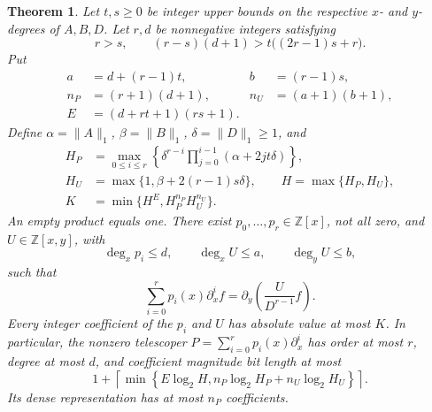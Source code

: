 \documentclass[11pt,a4paper]{article}
\newtheorem{theorem}{Theorem}[section]
\theoremstyle{remark}\newtheorem{remark}[theorem]{Remark}
\begin{document}
\begin{theorem}\label{he:main}
Let $t,s\ge0$ be integer upper bounds on the respective $x$- and
$y$-degrees of $A,B,D$. Let $r,d$ be nonnegative integers satisfying
\begin{equation}\label{he:admissible}
 r>s,\qquad
 (r-s)(d+1)>t\bigl((2r-1)s+r\bigr).
\end{equation}
Put
\begin{align*}
 a&=d+(r-1)t,& b&=(r-1)s,\\
 n_P&=(r+1)(d+1),&n_U&=(a+1)(b+1),\\
 E&=(d+rt+1)(rs+1).
\end{align*}
Define $\alpha=\|A\|_1$, $\beta=\|B\|_1$, $\delta=\|D\|_1\ge1$, and
\begin{align}
 H_P&=\max_{0\le i\le r}
  \left\{\delta^{r-i}\prod_{j=0}^{i-1}(\alpha+2jt\delta)\right\},
       \label{he:hp}\\
 H_U&=\max\{1,\beta+2(r-1)s\delta\},\qquad
 H=\max\{H_P,H_U\},\label{he:hu}\\
 K&=\min\{H^E,H_P^{n_P}H_U^{n_U}\}.\label{he:K}
\end{align}
An empty product equals one. There exist $p_0,\ldots,p_r\in\mathbb Z[x]$,
not all zero, and $U\in\mathbb Z[x,y]$, with
\[
 \deg_xp_i\le d,\qquad \deg_xU\le a,\qquad \deg_yU\le b,
\]
such that
\begin{equation}\label{he:identity}
 \sum_{i=0}^r p_i(x)\partial_x^i f
   =\partial_y\left(\frac{U}{D^{r-1}}f\right).
\end{equation}
Every integer coefficient of the $p_i$ and $U$ has absolute value at most
$K$. In particular, the nonzero telescoper
$P=\sum_{i=0}^rp_i(x)\partial_x^i$ has order at most $r$, degree at most
$d$, and coefficient magnitude bit length at most
\begin{equation}\label{he:bits}
 1+\left\lceil\min\left\{
 E\log_2H,
 n_P\log_2H_P+n_U\log_2H_U\right\}\right\rceil.
\end{equation}
Its dense representation has at most $n_P$ coefficients.
\end{theorem}
\end{document}
